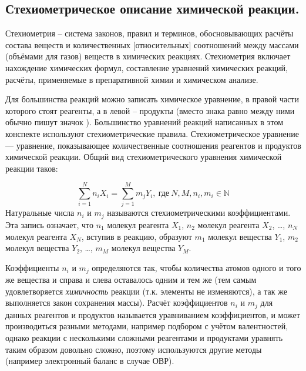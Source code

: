 \subsection{Стехиометрическое описание химической реакции.}
Стехиометрия -- система законов, правил и терминов, обосновывающих расчёты состава веществ и количественных [относительных] соотношений между массами (объёмами для газов) веществ в химических реакциях. Стехиометрия включает нахождение химических формул, составление уравнений химических реакций, расчёты, применяемые в препаративной химии и химическом анализе.

Для большинства реакций можно записать химическое уравнение, в правой части которого стоят реагенты, а в левой -- продукты (вместо знака равно между ними обычно пишут значок \ce{->}). Большинство уравнений реакций написанных в этом конспекте используют стехиометрические правила.  Стехиометрическое уравнение — уравнение, показывающее количественные соотношения реагентов и продуктов химической реакции. Общий вид стехиометрического уравнения химической реакции таков:

\begin{equation}
    \sum_{i = 1}^{N}n_{i}X_{i} = \sum_{j = 1}^{M}m_{j}Y_{i}, \ \text{где} \ N,M,n_{i},m_{i}\in\mathbb{N}
\end{equation}
Натуральные числа $n_{i}$ и $m_{j}$ называются стехиометрическими коэффициентами. Эта запись означает, что  $n_{1}$ молекул реагента $X_{1}$, $n_{2}$ молекул реагента $X_{2}$, …, $n_{N}$ молекул реагента $X_{N}$, вступив в реакцию, образуют $m_{1}$ молекул вещества $Y_{1}$, $m_2$ молекул вещества $Y_{2}$, …,  $m_{M}$ молекул вещества $Y_{M}$. 

Коэффициенты $n_{i}$ и $m_{j}$ определяются так, чтобы количества атомов одного и того же вещества и справа и слева оставалось одним и тем же (тем самым удовлетворяется \textit{химичность} реакции (т.к. элементы не изменяются), а так же выполняется закон сохранения массы). Расчёт коэффициентов $n_{i}$ и $m_{j}$ для данных реагентов и продуктов называется уравниванием коэффициентов, и может производиться разными методами, например подбором с учётом валентностей, однако реакции с несколькими сложными реагентами и продуктами уравнять таким образом довольно сложно, поэтому используются другие методы (например электронный баланс в случае ОВР).
